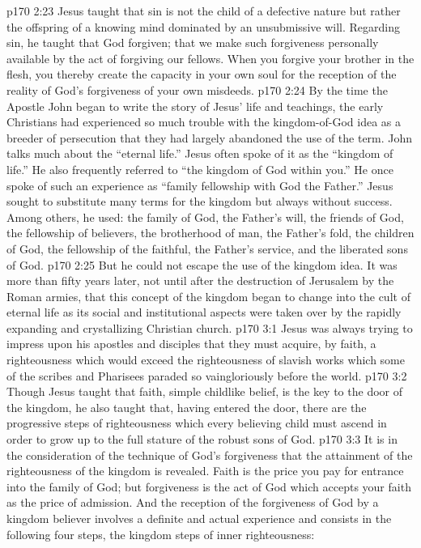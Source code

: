 \vs p170 2:23 Jesus taught that sin is not the child of a defective nature but rather the offspring of a knowing mind dominated by an unsubmissive will. Regarding sin, he taught that God  forgiven; that we make such forgiveness personally available by the act of forgiving our fellows. When you forgive your brother in the flesh, you thereby create the capacity in your own soul for the reception of the reality of God’s forgiveness of your own misdeeds.
\vs p170 2:24 By the time the Apostle John began to write the story of Jesus’ life and teachings, the early Christians had experienced so much trouble with the kingdom\hyp{}of\hyp{}God idea as a breeder of persecution that they had largely abandoned the use of the term. John talks much about the “eternal life.” Jesus often spoke of it as the \textcolor{ubdarkred}{“kingdom of life.”} He also frequently referred to \textcolor{ubdarkred}{“the kingdom of God within you.”} He once spoke of such an experience as \textcolor{ubdarkred}{“family fellowship with God the Father.”} Jesus sought to substitute many terms for the kingdom but always without success. Among others, he used: the family of God, the Father’s will, the friends of God, the fellowship of believers, the brotherhood of man, the Father’s fold, the children of God, the fellowship of the faithful, the Father’s service, and the liberated sons of God.\plusone
\vs p170 2:25 But he could not escape the use of the kingdom idea. It was more than fifty years later, not until after the destruction of Jerusalem by the Roman armies, that this concept of the kingdom began to change into the cult of eternal life as its social and institutional aspects were taken over by the rapidly expanding and crystallizing Christian church.
\vs p170 3:1 Jesus was always trying to impress upon his apostles and disciples that they must acquire, by faith, a righteousness which would exceed the righteousness of slavish works which some of the scribes and Pharisees paraded so vaingloriously before the world.
\vs p170 3:2 Though Jesus taught that faith, simple childlike belief, is the key to the door of the kingdom, he also taught that, having entered the door, there are the progressive steps of righteousness which every believing child must ascend in order to grow up to the full stature of the robust sons of God.
\vs p170 3:3 It is in the consideration of the technique of  God’s forgiveness that the attainment of the righteousness of the kingdom is revealed. Faith is the price you pay for entrance into the family of God; but forgiveness is the act of God which accepts your faith as the price of admission. And the reception of the forgiveness of God by a kingdom believer involves a definite and actual experience and consists in the following four steps, the kingdom steps of inner righteousness:
